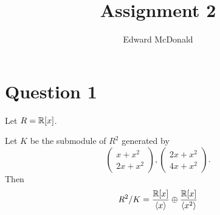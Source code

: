 \documentclass{unswmaths}
\begin{document}
\subject{Modules and Representation Theory}
\author{Edward McDonald}
\title{Assignment 2}


\setlength\parindent{0pt}

\newcommand{\Ft}{{\mathbb{F}_3}}
\newcommand{\isom}{\cong}
\newcommand{\im}{{\operatorname{im}}}


\unswtitle{}
    
\section*{Question 1}
Let $R = \mathbb{R}[x]$.
\begin{lemma}
    Let $K$ be the submodule of $R^2$ generated by
    \begin{equation*}
        \begin{pmatrix}x+x^2\\2x+x^2\end{pmatrix},\begin{pmatrix}2x+x^2\\4x+x^2\end{pmatrix}.
    \end{equation*} 
    Then
    \begin{equation*}
        R^2/K = \frac{\mathbb{R}[x]}{\langle x \rangle}\oplus\frac{\mathbb{R}[x]}{\langle x^2\rangle}
    \end{equation*}
\end{lemma}
\end{document}

